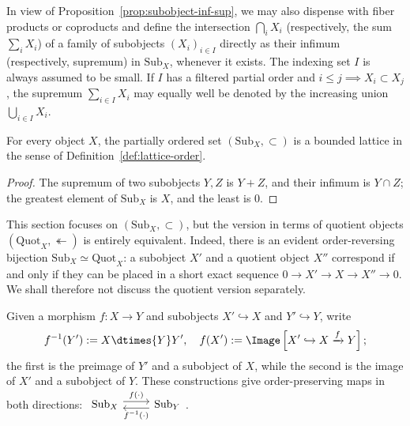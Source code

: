 \begin{convention}\label{con:increasing-union}
	In view of Proposition~\ref{prop:subobject-inf-sup}, we may also dispense
	with fiber products or coproducts and define the intersection
	$\bigcap_iX_i$ (respectively, the sum $\sum_iX_i$) of a family of
	subobjects $(X_i)_{i\in I}$ directly as their infimum (respectively,
	supremum) in $\mathrm{Sub}_X$, whenever it exists. The indexing set $I$ is
	always assumed to be small. If $I$ has a filtered partial order and
	$i\leq j\implies X_i\subset X_j$, the supremum $\sum_{i\in I}X_i$ may
	equally well be denoted by the increasing union $\bigcup_{i\in I}X_i$.
\end{convention}

\begin{corollary}
	For every object $X$, the partially ordered set
	$(\mathrm{Sub}_X,\subset)$ is a bounded lattice in the sense of
	Definition~\ref{def:lattice-order}.
\end{corollary}
\begin{proof}
	The supremum of two subobjects $Y,Z$ is $Y+Z$, and their infimum is
	$Y\cap Z$; the greatest element of $\mathrm{Sub}_X$ is $X$, and the least
	is $0$.
\end{proof}

This section focuses on $(\mathrm{Sub}_X,\subset)$, but the version in terms
of quotient objects $(\mathrm{Quot}_X,\twoheadleftarrow)$ is entirely
equivalent. Indeed, there is an evident order-reversing bijection
$\mathrm{Sub}_X\simeq\mathrm{Quot}_X$: a subobject $X'$ and a quotient
object $X''$ correspond if and only if they can be placed in a short exact
sequence $0\to X'\to X\to X''\to0$. We shall therefore not discuss the
quotient version separately.

\begin{definition}\label{def:subobject-image}
	Given a morphism $f:X\to Y$ and subobjects $X'\hookrightarrow X$ and
	$Y'\hookrightarrow Y$, write
	\[ f^{-1}(Y') := X \dtimes{Y} Y', \quad f(X') := \Image\left[ X' \hookrightarrow X \xrightarrow{f} Y \right]; \]
	the first is the preimage of $Y'$ and a subobject of $X$, while the second
	is the image of $X'$ and a subobject of $Y$. These
	constructions give order-preserving maps in both directions:
	$\begin{tikzcd}
		\mathrm{Sub}_X \arrow[r, yshift=0.3em, "f(\cdot)"] & \mathrm{Sub}_Y \arrow[l, yshift=-0.3em, "f^{-1}(\cdot)"]
	\end{tikzcd}$.
\end{definition}

